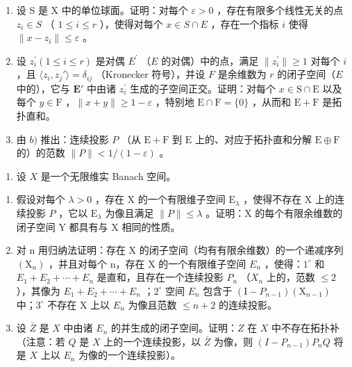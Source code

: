 \begin{enumerate}
\def\labelenumi{\alph{enumi})}
\item
  设 S 是 X 中的单位球面。证明：对每个 \(\varepsilon > 0\) ，存在有限多个线性无关的点 \(z_{i} \in S\) （ \(1 \leqslant i \leqslant r\) ），使得对每个 \(x \in S \cap E\) ，存在一个指标 \(i\) 使得 \(\| x - z_{i} \| \leqslant \varepsilon\) 。
\item
  设 \(z_{i}^{\prime}(1 \leqslant i \leqslant r)\) 是对偶 \(E^{\prime}\) （\(E\) 的对偶）中的点，满足 \(\| z_{i}^{\prime}\| \geqslant 1\) 对每个 \(i\) ，且 \(\langle z_i, z_j' \rangle = \delta_{ij}\) （Kronecker 符号），并设 \(F\) 是余维数为 \(r\) 的闭子空间（\(E\) 中的），它与 \(\mathbf{E}'\) 中由诸 \(z_{i}^{\prime}\) 生成的子空间正交。证明：对每个 \(x\in \mathrm{S}\cap \mathrm{E}\) 以及每个 \(y\in \mathrm{F}\) ，\(\| x + y\| \geqslant 1 - \varepsilon\) ，特别地 \(\mathrm{E}\cap \mathrm{F} = \{0\}\) ，从而和 \(\mathrm{E} + \mathrm{F}\) 是拓扑直和。
\item
  由 \(b)\) 推出：连续投影 \(P\) （从 \(\mathrm{E} + \mathrm{F}\) 到 \(\mathrm{E}\) 上的、对应于拓扑直和分解 \(\mathrm{E} \oplus \mathrm{F}\) 的）的范数 \(\| P \| < 1 / (1 - \varepsilon)\) 。
\end{enumerate}

\begin{enumerate}
\def\labelenumi{\arabic{enumi})}
\setcounter{enumi}{22}
\tightlist
\item
  设 \(X\) 是一个无限维实 Banach 空间。
\end{enumerate}

\begin{enumerate}
\def\labelenumi{\alph{enumi})}
\item
  假设对每个 \(\lambda > 0\) ，存在 X 的一个有限维子空间 \(\mathrm{E}_{\lambda}\) ，使得不存在 X 上的连续投影 \(P\) ，它以 \(\mathrm{E}_{\lambda}\) 为像且满足 \(\| P \| \leqslant \lambda\) 。证明：X 的每个有限余维数的闭子空间 Y 都具有与 X 相同的性质。
\item
  对 n 用归纳法证明：存在 X 的闭子空间（均有有限余维数）的一个递减序列 \((\mathrm{X}_{n})\) ，并且对每个 n，存在 X 的一个有限维子空间 \(E_{n}\) ，使得：\(1^{\circ}\) 和 \(E_{1} + E_{2} + \cdots + E_{n}\) 是直和，且存在一个连续投影 \(P_{n}\) （\(X_{n}\) 上的，范数 \(\leqslant 2\) ），其像为 \(E_{1} + E_{2} + \cdots + E_{n}\) ；\(2^{\circ}\) 空间 \(E_{n}\) 包含于 \((\mathrm{I} - P_{n-1})(\mathrm{X}_{n-1})\) 中；\(3^{\circ}\) 不存在 X 上以 \(E_{n}\) 为像且范数 \(\leqslant n + 2\) 的连续投影。
\item
  设 \(\bar{Z}\) 是 \(X\) 中由诸 \(E_{n}\) 的并生成的闭子空间。证明：\(Z\) 在 \(X\) 中不存在拓扑补（注意：若 \(Q\) 是 \(X\) 上的一个连续投影，以 \(\bar{Z}\) 为像，则 \((I - P_{n-1})P_nQ\) 将是 \(X\) 上以 \(E_{n}\) 为像的一个连续投影）。
\end{enumerate}
\relax{}
